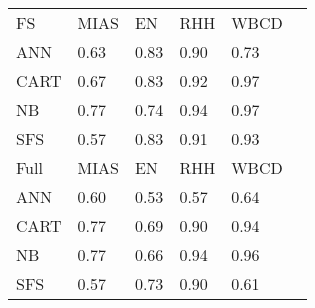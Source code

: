 \begin{tabular}{|l|l|l|l|l|l}
\cline{1-5}
FS      & MIAS           & EN             & RHH            & WBCD           &         \\
\cline{1-5}
ANN     & 0.63           & 0.83           & 0.90           & 0.73           &         \\
CART    & 0.67           & 0.83           & 0.92           & 0.97           &         \\
NB      & 0.77           & 0.74           & 0.94           & 0.97           &         \\
SFS     & 0.57           & 0.83           & 0.91           & 0.93           &         \\
\cline{1-5}
Full    & MIAS           & EN             & RHH            & WBCD           &         \\
\cline{1-5}
ANN     & 0.60           & 0.53           & 0.57           & 0.64           &         \\
CART    & 0.77           & 0.69           & 0.90           & 0.94           &         \\
NB      & 0.77           & 0.66           & 0.94           & 0.96           &         \\
SFS     & 0.57           & 0.73           & 0.90           & 0.61           &         \\
\cline{1-5}
\end{tabular}
